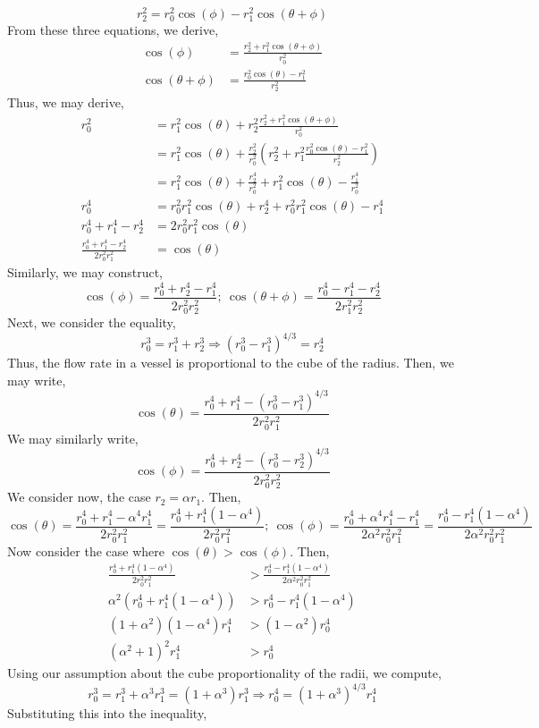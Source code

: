 \documentclass[letterpaper,10pt]{article}
\begin{document}
\[r_2^2=r_0^2\cos(\phi)-r_1^2\cos(\theta+\phi)\]
From these three equations, we derive,
\begin{align*}
\cos(\phi)&=\frac{r_2^2+r_1^2\cos(\theta+\phi)}{r_0^2}\\
\cos(\theta+\phi) &= \frac{r_0^2\cos(\theta)-r_1^2}{r_2^2}
\end{align*}
Thus, we may derive,
\begin{align*}
r_0^2 &= r_1^2\cos(\theta) + r_2^2\frac{r_2^2+r_1^2\cos(\theta+\phi)}{r_0^2}\\
&= r_1^2\cos(\theta) + \frac{r_2^2}{r_0^2}(r_2^2+r_1^2\frac{r_0^2\cos(\theta)-r_1^2}{r_2^2})\\
&=r_1^2\cos(\theta)+\frac{r_2^4}{r_0^2}+r_1^2\cos(\theta)-\frac{r_1^4}{r_0^2}\\
r_0^4 &= r_0^2r_1^2\cos(\theta)+r_2^4+r_0^2r_1^2\cos(\theta)-r_1^4\\
r_0^4+r_1^4-r_2^4 &= 2r_0^2r_1^2\cos(\theta)\\
\frac{r_0^4+r_1^4-r_2^4}{2r_0^2r_1^2} &= \cos(\theta)
\end{align*}
Similarly, we may construct,
\[\cos(\phi)=\frac{r_0^4+r_2^4-r_1^4}{2r_0^2r_2^2};\ \cos(\theta+\phi)=\frac{r_0^4-r_1^4-r_2^4}{2r_1^2r_2^2}\]
Next, we consider the equality,
\[r_0^3=r_1^3+r_2^3\Rightarrow (r_0^3-r_1^3)^{4/3}=r_2^4\]
Thus, the flow rate in a vessel is proportional to the cube of the radius. Then, we may write,
\[\cos(\theta)=\frac{r_0^4+r_1^4-(r_0^3-r_1^3)^{4/3}}{2r_0^2r_1^2}\]
We may similarly write,
\[\cos(\phi)=\frac{r_0^4+r_2^4-(r_0^3-r_2^3)^{4/3}}{2r_0^2r_2^2}\]
We consider now, the case $r_2=\alpha r_1$. Then,
\[\cos(\theta)=\frac{r_0^4+r_1^4-\alpha^4r_1^4}{2r_0^2r_1^2}=\frac{r_0^4+r_1^4(1-\alpha^4)}{2r_0^2r_1^2};\ \cos(\phi)=\frac{r_0^4+\alpha^4r_1^4-r_1^4}{2\alpha^2r_0^2r_1^2}=\frac{r_0^4-r_1^4(1-\alpha^4)}{2\alpha^2r_0^2r_1^2} \]
Now consider the case where $\cos(\theta)>\cos(\phi)$. Then,
\begin{align*}
\frac{r_0^4+r_1^4(1-\alpha^4)}{2r_0^2r_1^2} &> \frac{r_0^4-r_1^4(1-\alpha^4)}{2\alpha^2r_0^2r_1^2}\\
\alpha^2(r_0^4+r_1^4(1-\alpha^4)) &> r_0^4-r_1^4(1-\alpha^4)\\
(1+\alpha^2)(1-\alpha^4)r_1^4 &> (1-\alpha^2)r_0^4\\
(\alpha^2+1)^2r_1^4 &> r_0^4
\end{align*}
Using our assumption about the cube proportionality of the radii, we compute,
\[r_0^3=r_1^3+\alpha^3r_1^3=(1+\alpha^3)r_1^3\Rightarrow r_0^4=(1+\alpha^3)^{4/3}r_1^4\]
Substituting this into the inequality,
\end{document}

